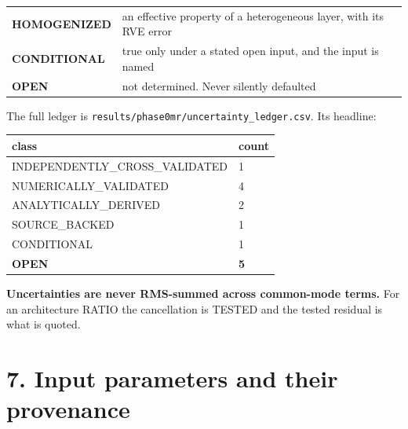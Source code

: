 \documentclass[10pt,]{article}
\begin{document}
\begin{longtable}[]{@{}ll@{}}
\begin{minipage}[t]{0.47\columnwidth}
\textbf{HOMOGENIZED}\strut
\end{minipage} & \begin{minipage}[t]{0.47\columnwidth}\raggedright
an effective property of a heterogeneous layer, with its RVE error\strut
\end{minipage}\tabularnewline
\begin{minipage}[t]{0.47\columnwidth}\raggedright
\textbf{CONDITIONAL}\strut
\end{minipage} & \begin{minipage}[t]{0.47\columnwidth}\raggedright
true only under a stated open input, and the input is named\strut
\end{minipage}\tabularnewline
\begin{minipage}[t]{0.47\columnwidth}\raggedright
\textbf{OPEN}\strut
\end{minipage} & \begin{minipage}[t]{0.47\columnwidth}\raggedright
not determined. Never silently defaulted\strut
\end{minipage}\tabularnewline
\bottomrule
\end{longtable}

The full ledger is \texttt{results/phase0mr/uncertainty\_ledger.csv}.
Its headline:

\begin{longtable}[]{@{}ll@{}}
\toprule
class & count\tabularnewline
\midrule
\endhead
INDEPENDENTLY\_CROSS\_VALIDATED & 1\tabularnewline
NUMERICALLY\_VALIDATED & 4\tabularnewline
ANALYTICALLY\_DERIVED & 2\tabularnewline
SOURCE\_BACKED & 1\tabularnewline
CONDITIONAL & 1\tabularnewline
\textbf{OPEN} & \textbf{5}\tabularnewline
\bottomrule
\end{longtable}

\textbf{Uncertainties are never RMS-summed across common-mode terms.}
For an architecture RATIO the cancellation is TESTED and the tested
residual is what is quoted.

\newpage

\hypertarget{input-parameters-and-their-provenance}{%
\section{7. Input parameters and their
provenance}\label{input-parameters-and-their-provenance}}
\end{document}
